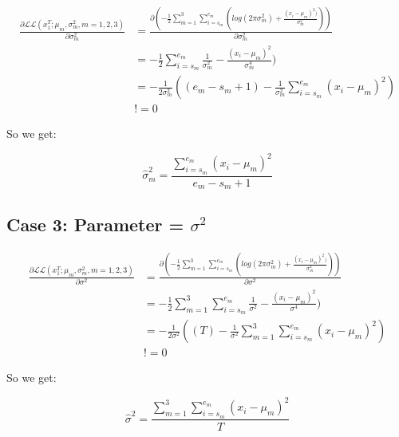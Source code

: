 \begin{align}
\frac{\partial\mathcal{L}\mathcal{L}(x_1^T; \mu_m, \sigma_m^2, m = 1,2,3)}{\partial\sigma_m^2} &= \frac{\partial(-\frac{1}{2}\sum_{m=1}^{3}\sum_{i=s_m}^{e_m}(log(2\pi\sigma_m^2)+\frac{(x_i - \mu_m)^2)}{\sigma_m^2}))}{\partial\sigma_m^2} \\
&= -\frac{1}{2}\sum_{i=s_m}^{e_m}\frac{1}{\sigma_m^2} - \frac{(x_i - \mu_m)^2}{\sigma_m^4}) \\
&= -\frac{1}{2\sigma_m^2}((e_m - s_m + 1) - \frac{1}{\sigma_m^2}\sum_{i=s_m}^{e_m}(x_i - \mu_m)^2) \\
&!= 0
\end{align}

So we get: 

\[
\hat{\sigma}_m^2 = \frac{\sum_{i=s_m}^{e_m}(x_i - \mu_m)^2}{e_m - s_m + 1}
\]

\subsection*{Case 3: Parameter = $\sigma^2$} %
\label{sub:_sigma}

\begin{align}
\frac{\partial\mathcal{L}\mathcal{L}(x_1^T; \mu_m, \sigma_m^2, m = 1,2,3)}{\partial\sigma^2} &= \frac{\partial(-\frac{1}{2}\sum_{m=1}^{3}\sum_{i=s_m}^{e_m}(log(2\pi\sigma_m^2)+\frac{(x_i - \mu_m)^2)}{\sigma_m^2}))}{\partial\sigma^2} \\
&= -\frac{1}{2}\sum_{m=1}^{3}\sum_{i=s_m}^{e_m}\frac{1}{\sigma^2} - \frac{(x_i - \mu_m)^2}{\sigma^4}) \\
&= -\frac{1}{2\sigma^2}((T) - \frac{1}{\sigma^2}\sum_{m=1}^{3}\sum_{i=s_m}^{e_m}(x_i - \mu_m)^2) \\
&!= 0
\end{align}

So we get: 

\[
\hat{\sigma}^2 = \frac{\sum_{m=1}^{3}\sum_{i=s_m}^{e_m}(x_i - \mu_m)^2}{T}
\]

